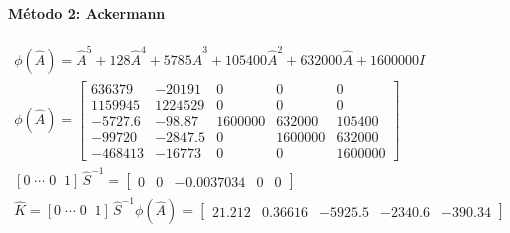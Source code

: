 \documentclass[11pt]{article}
\begin{document}
\paragraph{Método 2: Ackermann}
\begin{gather*}
\phi(\hat{A})=\hat{A}^{5} + 128\hat{A}^{4} + 5785\hat{A}^{3} + 105400\hat{A}^{2} + 632000\hat{A} + 1600000I\\
\phi(\hat{A})=\begin{bmatrix}636379 & -20191 & 0 & 0 & 0 \\ 1159945 & 1224529 & 0 & 0 & 0 \\ -5727.6 & -98.87 & 1600000 & 632000 & 105400 \\ -99720 & -2847.5 & 0 & 1600000 & 632000 \\ -468413 & -16773 & 0 & 0 & 1600000\end{bmatrix}\\
[0\;\cdots\;0\;\;1]\,\hat{S}^{-1}=\begin{bmatrix}0 & 0 & -0.0037034 & 0 & 0\end{bmatrix}\\
\hat{K}=[0\;\cdots\;0\;\;1]\,\hat{S}^{-1}\phi(\hat{A})=\begin{bmatrix}21.212 & 0.36616 & -5925.5 & -2340.6 & -390.34\end{bmatrix}
\end{gather*}
\end{document}
